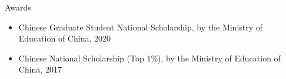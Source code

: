 \documentclass{resume} %
\begin{document}
\begin{rSection}{Awards}
\begin{itemize}[leftmargin=10pt]
\setlength{\itemsep}{-3pt}
    \item Chinese Graduate Student National Scholarship, by the Ministry of Education of China, 2020
    \item Chinese National Scholarship (Top 1\%), by the Ministry of Education of China, 2017
\end{itemize}
\end{rSection}
\end{document}
